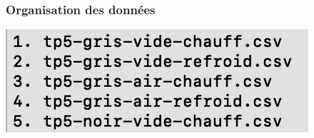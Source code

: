 \documentclass{beamer}
\begin{document}
\begin{frame}
\frametitle{Organisation des données}

\centering
\begin{minipage}{0.48\textwidth}
    \centering
    \includegraphics[width=\linewidth]{Fig/ls-csv.png}
\end{minipage}
\hfill
\begin{minipage}{0.48\textwidth}
    \centering
\end{minipage}
\end{frame}
\end{document}

